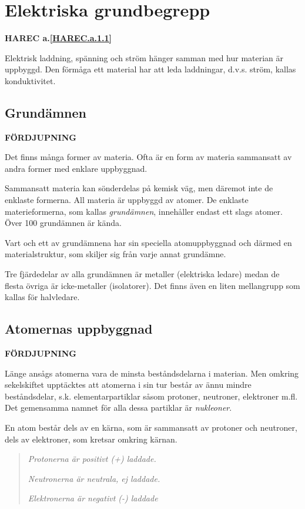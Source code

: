 \section{Elektriska grundbegrepp}
\textbf{HAREC a.\ref{HAREC.a.1.1}\label{myHAREC.a.1.1}}

Elektrisk laddning, spänning och ström hänger samman med hur materian är
uppbyggd. Den förmåga ett material har att leda laddningar, d.v.s. ström,
kallas konduktivitet.

\subsection{Grundämnen}
\textbf{FÖRDJUPNING}

Det finns många former av materia. Ofta är en form av materia sammansatt av
andra former med enklare uppbyggnad.

Sammansatt materia kan sönderdelas på kemisk väg, men däremot inte de enklaste
formerna. All materia är uppbyggd av atomer. De enklaste materieformerna, som
kallas \emph{grundämnen}, innehåller endast ett slags atomer. Över 100
grundämnen är kända.

Vart och ett av grundämnena har sin speciella atomuppbyggnad och därmed en
materialstruktur, som skiljer sig från varje annat grundämne.

Tre fjärdedelar av alla grundämnen är metaller (elektriska ledare) medan de
flesta övriga är icke-metaller (isolatorer). Det finns även en liten
mellangrupp som kallas för halvledare.

\subsection{Atomernas uppbyggnad}
\textbf{FÖRDJUPNING}

Länge ansågs atomerna vara de minsta beståndsdelarna i materian. Men omkring
sekelskiftet upptäcktes att atomerna i sin tur består av ännu mindre
beståndsdelar, s.k. elementarpartiklar såsom protoner, neutroner, elektroner
m.fl. Det gemensamma namnet för alla dessa partiklar är \emph{nukleoner}.

En atom består dels av en kärna, som är sammansatt av protoner och neutroner,
dels av elektroner, som kretsar omkring kärnan.

\begin{quote}
\emph{Protonerna är positivt (+) laddade.}

\emph{Neutronerna är neutrala, ej laddade.}

\emph{Elektronerna är negativt (-) laddade}
\end{quote}

